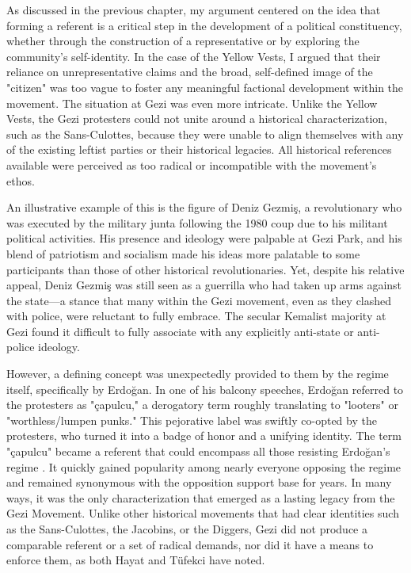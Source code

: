 As discussed in the previous chapter, my argument centered on the idea that forming a referent is a critical step in the development of a political constituency, whether through the construction of a representative or by exploring the community’s self-identity. In the case of the Yellow Vests, I argued that their reliance on unrepresentative claims and the broad, self-defined image of the "citizen" was too vague to foster any meaningful factional development within the movement. The situation at Gezi was even more intricate. Unlike the Yellow Vests, the Gezi protesters could not unite around a historical characterization, such as the Sans-Culottes, because they were unable to align themselves with any of the existing leftist parties or their historical legacies. All historical references available were perceived as too radical or incompatible with the movement’s ethos.

An illustrative example of this is the figure of Deniz Gezmiş, a revolutionary who was executed by the military junta following the 1980 coup due to his militant political activities. His presence and ideology were palpable at Gezi Park, and his blend of patriotism and socialism made his ideas more palatable to some participants than those of other historical revolutionaries. Yet, despite his relative appeal, Deniz Gezmiş was still seen as a guerrilla who had taken up arms against the state—a stance that many within the Gezi movement, even as they clashed with police, were reluctant to fully embrace. The secular Kemalist majority at Gezi found it difficult to fully associate with any explicitly anti-state or anti-police ideology.

However, a defining concept was unexpectedly provided to them by the regime itself, specifically by Erdoğan. In one of his balcony speeches, Erdoğan referred to the protesters as "çapulcu," a derogatory term roughly translating to "looters" or "worthless/lumpen punks." This pejorative label was swiftly co-opted by the protesters, who turned it into a badge of honor and a unifying identity. The term "çapulcu" became a referent that could encompass all those resisting Erdoğan’s regime \parencite[2]{ulug2019}. It quickly gained popularity among nearly everyone opposing the regime and remained synonymous with the opposition support base for years. In many ways, it was the only characterization that emerged as a lasting legacy from the Gezi Movement. Unlike other historical movements that had clear identities such as the Sans-Culottes, the Jacobins, or the Diggers, Gezi did not produce a comparable referent or a set of radical demands, nor did it have a means to enforce them, as both Hayat and Tüfekci have noted.

